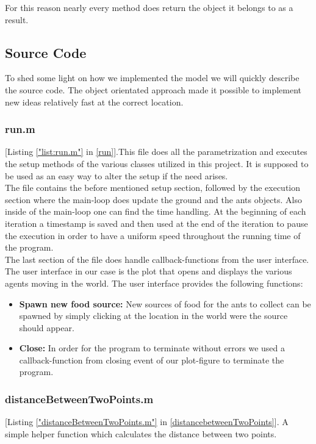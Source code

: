 \documentclass[11pt]{article}
\begin{document}

For this reason nearly every method does return the object it belongs to as a result.

\subsection{Source Code}
To shed some light on how we implemented the model we will quickly describe the source code.
The object orientated approach made it possible to implement new ideas relatively fast at the correct
location.
\subsubsection{run.m}
[Listing \ref{"list:run.m"} in \ref{run}].This file does all the parametrization and executes the setup methods of the various classes utilized
in this project. It is supposed to be used as an easy way to alter the setup if the need arises.\\
The file contains the before mentioned setup section, followed by the execution section where the
main-loop does update the ground and the ants objects. Also inside of the main-loop one can find
the time handling. At the beginning of each iteration a timestamp is saved and then used at the end
of the iteration to pause the execution in order to have a uniform speed throughout the running time
of the program.\\
The last section of the file does handle callback-functions from the user interface. The user interface
in our case is the plot that opens and displays the various agents moving in the world. The user
interface provides the following functions:

\begin{itemize}
\item \textbf{Spawn new food source:} New sources of food for the ants to collect can be spawned by
simply clicking at the location in the world were the source should appear.
\item \textbf{Close:} In order for the program to terminate without errors we used a callback-function
from closing event of our plot-figure to terminate the program.
\end{itemize}








\subsubsection{distanceBetweenTwoPoints.m}
[Listing \ref{"distanceBetweenTwoPoints.m"} in \ref{distancebetweenTwoPoints}]. A simple helper function which calculates the distance between two points.
\end{document}
